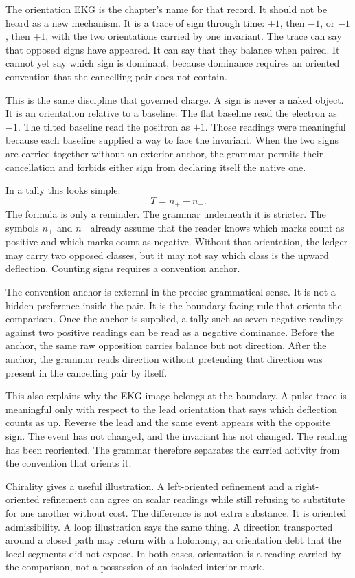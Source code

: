 The orientation EKG is the chapter's name for that record. It should not be
heard as a new mechanism. It is a trace of sign through time: \(+1\), then
\(-1\), or \(-1\), then \(+1\), with the two orientations carried by one
invariant. The trace can say that opposed signs have appeared. It can say
that they balance when paired. It cannot yet say which sign is dominant,
because dominance requires an oriented convention that the cancelling pair
does not contain.

This is the same discipline that governed charge. A sign is never a naked
object. It is an orientation relative to a baseline. The flat baseline read
the electron as \(-1\). The tilted baseline read the positron as \(+1\).
Those readings were meaningful because each baseline supplied a way to face
the invariant. When the two signs are carried together without an exterior
anchor, the grammar permits their cancellation and forbids either sign from
declaring itself the native one.

In a tally this looks simple:
\[
  T = n_+ - n_- .
\]
The formula is only a reminder. The grammar underneath it is stricter. The
symbols \(n_+\) and \(n_-\) already assume that the reader knows which marks
count as positive and which marks count as negative. Without that
orientation, the ledger may carry two opposed classes, but it may not say
which class is the upward deflection. Counting signs requires a convention
anchor.

The convention anchor is external in the precise grammatical sense. It is
not a hidden preference inside the pair. It is the boundary-facing rule that
orients the comparison. Once the anchor is supplied, a tally such as seven
negative readings against two positive readings can be read as a negative
dominance. Before the anchor, the same raw opposition carries balance but not
direction. After the anchor, the grammar reads direction without pretending
that direction was present in the cancelling pair by itself.

This also explains why the EKG image belongs at the boundary. A pulse trace
is meaningful only with respect to the lead orientation that says which
deflection counts as up. Reverse the lead and the same event appears with the
opposite sign. The event has not changed, and the invariant has not changed.
The reading has been reoriented. The grammar therefore separates the carried
activity from the convention that orients it.

Chirality gives a useful illustration. A left-oriented refinement and a
right-oriented refinement can agree on scalar readings while still refusing
to substitute for one another without cost. The difference is not extra
substance. It is oriented admissibility. A loop illustration says the same
thing. A direction transported around a closed path may return with a
holonomy, an orientation debt that the local segments did not expose. In both
cases, orientation is a reading carried by the comparison, not a possession
of an isolated interior mark.

